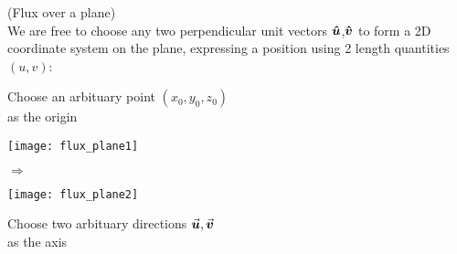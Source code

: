 \documentclass[class=article, crop=false, 12pt]{standalone}
\begin{document}
\begin{example}
    (Flux over a plane)\\
    We are free to choose any two perpendicular unit vectors $\vu*{u}$,$\vu*{v}$ 
    to form a 2D coordinate system on the plane, 
    expressing a position using 2 length quantities $(u,v)$:
    \begin{center}
        \begin{minipage}{0.2\linewidth}
            \centering
            Choose an arbituary point 
            $(x_0,y_0,z_0)$\\ as the origin
        \end{minipage}
        \begin{minipage}{0.22\linewidth}
            \centering
            \texttt{[image: flux\_plane1]}
        \end{minipage}
        \qquad$\Rightarrow$\qquad
        \begin{minipage}{0.22\linewidth}
            \centering
            \texttt{[image: flux\_plane2]}
        \end{minipage}
        \begin{minipage}{0.2\linewidth}
            \centering
            Choose two arbituary directions 
            $\va*{u},\va*{v}$\\ as the axis
        \end{minipage}
    \end{center}


\end{example}
\end{document}
